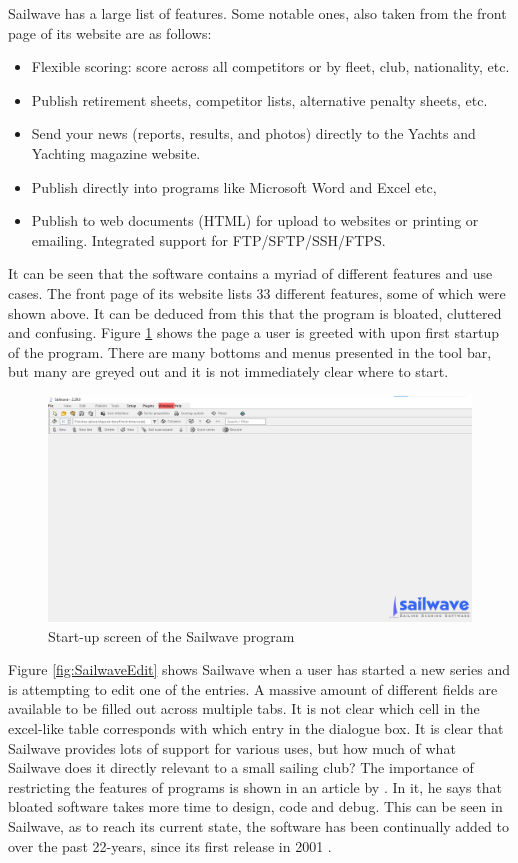 \documentclass{l4proj}
\begin{document}
Sailwave has a large list of features. Some notable ones, also taken from the front page of its website \citep{sailwave} are as follows:
\begin{itemize}
    \item
    Flexible scoring: score across all competitors or by fleet, club, nationality, etc.
    \item
    Publish retirement sheets, competitor lists, alternative penalty sheets, etc.
    \item
    Send your news (reports, results, and photos) directly to the Yachts and Yachting magazine website.
    \item
    Publish directly into programs like Microsoft Word and Excel etc,
    \item
    Publish to web documents (HTML) for upload to websites or printing or emailing. Integrated support for FTP/SFTP/SSH/FTPS.
\end{itemize}

It can be seen that the software contains a myriad of different features and use cases. The front page of its website lists 33 different features, some of which were shown above. It can be deduced from this that the program is bloated, cluttered and confusing.
Figure \ref{fig:SailwaveEmpty} shows the page a user is greeted with upon first startup of the program. There are many bottoms and menus presented in the tool bar, but many are greyed out and it is not immediately clear where to start.

\begin{figure}[h!]
    \centering
    \includegraphics[width=0.6\linewidth]{images/SailwaveEmpty.png} 

    \caption{Start-up screen of the Sailwave program \citep{sailwave}
    }

    \label{fig:SailwaveEmpty} 
\end{figure}

Figure \ref{fig:SailwaveEdit} shows Sailwave when a user has started a new series and is attempting to edit one of the entries. A massive amount of different fields are available to be filled out across multiple tabs. It is not clear which cell in the excel-like table corresponds with which entry in the dialogue box. It is clear that Sailwave provides lots of support for various uses, but how much of what Sailwave does it directly relevant to a small sailing club? The importance of restricting the features of programs is shown in an article by \citet{leanSoftware}. In it, he says that bloated software takes more time to design, code and debug. This can be seen in Sailwave, as to reach its current state, the software has been continually added to over the past 22-years, since its first release in 2001 \citep{sailwave}.
\end{document}
